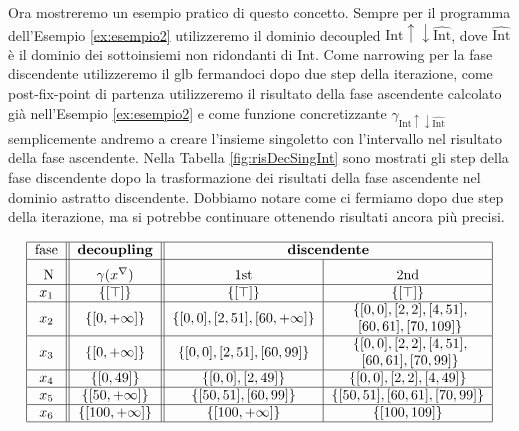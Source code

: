 \begin{example}
Ora mostreremo un esempio pratico di questo concetto. Sempre per il programma dell'Esempio \ref{ex:esempio2} utilizzeremo il dominio decoupled \(\textrm{Int}\uparrow\downarrow\widehat{\textrm{Int}}\), dove \(\widehat{\textrm{Int}}\) è il dominio dei sottoinsiemi non ridondanti di Int. Come narrowing per la fase discendente utilizzeremo il glb fermandoci dopo due step della iterazione, come post-fix-point di partenza utilizzeremo il risultato della fase ascendente calcolato già nell'Esempio \ref{ex:esempio2} e come funzione concretizzante \(\gamma_{\textrm{Int}\uparrow\downarrow\widehat{\textrm{Int}}}\) semplicemente andremo a creare l'insieme singoletto con l'intervallo nel risultato della fase ascendente. Nella Tabella \ref{fig:risDecSingInt} sono mostrati gli step della fase discendente dopo la trasformazione dei risultati della fase ascendente nel dominio astratto discendente. Dobbiamo notare come ci fermiamo dopo due step della iterazione, ma si potrebbe continuare ottenendo risultati ancora più precisi. 

\begin{table}
\begin{minipage}{\textwidth}
    \centering
    \vspace{1cm}
        \[
        \begin{tabular}{|c||c||c|c|}
        \hline
        \multicolumn{1}{|c||}{fase} & 
        \multicolumn{1}{c||}{\textbf{decoupling}} & 
        \multicolumn{2}{c|}{\textbf{discendente}}\\
        
        \hline 
        \rule{0pt}{14pt} 
        N &  
        \(\gamma(x^{\nabla})\) & 
        1st & 2nd \\
        \hline
        $x_1$ & $\{\left[\top\right]\}$ 
        & $\{\left[\top\right]\}$ & $\{\left[\top\right]\}$ \\
        \hline
        $x_2$ & $\{\left[0, +\infty\right]\}$ 
        & $\{[0, 0], [2, 51], \left[60, +\infty\right]\}$  & \specialcell{$\{[0, 0], [2, 2], [4, 51],$\\$ [60, 61], [70, 109]\}$} \\
        \hline
        $x_3$ & $\{\left[0, +\infty\right]\}$ 
        & $\{[0, 0], [2, 51], [60, 99]\}$ & \specialcell{$\{[0, 0], [2, 2], [4, 51],$\\$[60, 61], [70, 99]\}$} \\
        \hline
        $x_4$ & $\{\left[0, 49\right]\}$ 
        & $\{[0, 0], [2, 49]\}$& $\{[0, 0], [2, 2], [4, 49]\}$ \\
        \hline
        $x_5$ & $\{\left[50, +\infty\right]\}$ 
        & $\{[50, 51], [60, 99]\}$& $\{[50, 51], [60, 61], [70, 99]\}$ \\
        \hline
        $x_6$ & $\{\left[100, +\infty\right]\}$
        & $\{[100, +\infty]\}$& $\{[100, 109]\}$ \\
        \hline
        \end{tabular}
        \]
    \end{minipage}
    \caption{Tabella dei risultati del dominio \(\textrm{Sign}\uparrow\downarrow\textrm{Int}\) divisi per step e fase.}
    \label{fig:risDecSingInt}
\end{table}
\end{example}